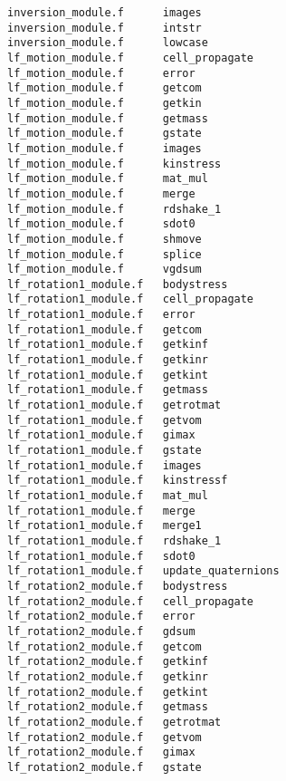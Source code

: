 \begin{verbatim}
inversion_module.f      images                    
inversion_module.f      intstr                    
inversion_module.f      lowcase                   
lf_motion_module.f      cell_propagate            
lf_motion_module.f      error                     
lf_motion_module.f      getcom                    
lf_motion_module.f      getkin                    
lf_motion_module.f      getmass                   
lf_motion_module.f      gstate                    
lf_motion_module.f      images                    
lf_motion_module.f      kinstress                 
lf_motion_module.f      mat_mul                   
lf_motion_module.f      merge                     
lf_motion_module.f      rdshake_1                 
lf_motion_module.f      sdot0                     
lf_motion_module.f      shmove                    
lf_motion_module.f      splice                    
lf_motion_module.f      vgdsum                    
lf_rotation1_module.f   bodystress                
lf_rotation1_module.f   cell_propagate            
lf_rotation1_module.f   error                     
lf_rotation1_module.f   getcom                    
lf_rotation1_module.f   getkinf                   
lf_rotation1_module.f   getkinr                   
lf_rotation1_module.f   getkint                   
lf_rotation1_module.f   getmass                   
lf_rotation1_module.f   getrotmat                 
lf_rotation1_module.f   getvom                    
lf_rotation1_module.f   gimax                     
lf_rotation1_module.f   gstate                    
lf_rotation1_module.f   images                    
lf_rotation1_module.f   kinstressf                
lf_rotation1_module.f   mat_mul                   
lf_rotation1_module.f   merge                     
lf_rotation1_module.f   merge1                    
lf_rotation1_module.f   rdshake_1                 
lf_rotation1_module.f   sdot0                     
lf_rotation1_module.f   update_quaternions        
lf_rotation2_module.f   bodystress                
lf_rotation2_module.f   cell_propagate            
lf_rotation2_module.f   error                     
lf_rotation2_module.f   gdsum                     
lf_rotation2_module.f   getcom                    
lf_rotation2_module.f   getkinf                   
lf_rotation2_module.f   getkinr                   
lf_rotation2_module.f   getkint                   
lf_rotation2_module.f   getmass                   
lf_rotation2_module.f   getrotmat                 
lf_rotation2_module.f   getvom                    
lf_rotation2_module.f   gimax                     
lf_rotation2_module.f   gstate                    

\end{verbatim}
